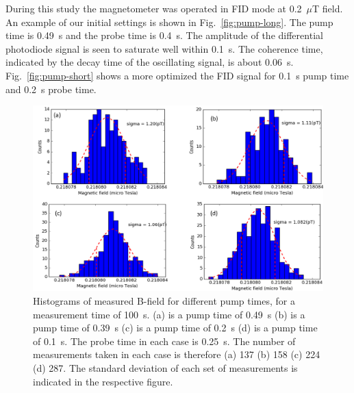 During this study the magnetometer was operated in FID mode at
0.2~$\mu$T field.
An example of our initial settings is shown in
Fig.~\ref{fig:pump-long}.  The pump time is 0.49~s and the probe time
is 0.4~s.  The amplitude of the differential photodiode signal is seen
to saturate well within 0.1~s.  The coherence time, indicated by the
decay time of the oscillating signal, is about 0.06~s.
Fig.~\ref{fig:pump-short} shows a more optimized the FID signal for
0.1~s pump time and 0.2~s probe time.
\begin{figure}%
  \centering\includegraphics[width=\linewidth]{figures/pump_time_}
  \caption{Histograms of measured B-field for different pump times, for a measurement time of 100~s.  (a) is a pump time of
      0.49~s (b) is a pump time of 0.39~s (c) is a pump time of 0.2~s
      (d) is a pump time of 0.1~s.  The probe time in each case is
      0.25~s.  The number of measurements taken in each case is
      therefore (a) 137 (b) 158 (c) 224 (d) 287.  The standard
      deviation of each set of measurements is indicated in the
      respective figure.}\label{fig:different-pump-time}
\end{figure}
